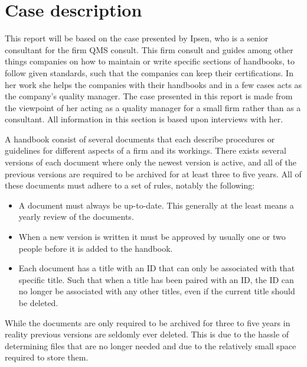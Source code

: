\section{Case description} \label{sec:CaseDescription}

This report will be based on the case presented by Ipsen, who is a senior consultant for the firm QMS consult.
This firm consult and guides among other things companies on how to maintain or write specific sections of handbooks, to follow given standards, such that the companies can keep their certifications.
In her work she helps the companies with their handbooks and in a few cases acts as the company's quality manager.
The case presented in this report is made from the viewpoint of her acting as a quality manager for a small firm rather than as a consultant.
All information in this section is based upon interviews with her.

A handbook consist of several documents that each describe procedures or guidelines for different aspects of a firm and its workings.
There exists several versions of each document where only the newest version is active, and all of the previous versions are required to be archived for at least three to five years. All of these documents must adhere to a set of rules, notably the following:

\begin{itemize}
	\item 
	A document must always be up-to-date.
	This generally at the least means a yearly review of the documents.
	\item 
	When a new version is written it must be approved by usually one or two people before it is added to the handbook.
	\item 
	Each document has a title with an ID that can only be associated with that specific title. 
	Such that when a title has been paired with an ID, the ID can no longer be associated with any other titles, even if the current title should be deleted.
\end{itemize}

While the documents are only required to be archived for three to five years in reality previous versions are seldomly ever deleted.
This is due to the hassle of determining files that are no longer needed and due to the relatively small space required to store them.

